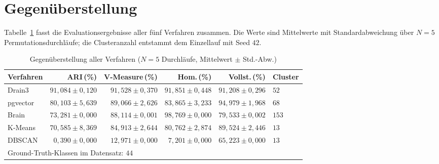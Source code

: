 \section{Gegenüberstellung}
\label{sec:eval:vergleich}

Tabelle~\ref{tab:eval:gesamt} fasst die Evaluationsergebnisse aller fünf Verfahren zusammen.
Die Werte sind Mittelwerte mit Standardabweichung über $N = 5$ Permutationsdurchläufe;
die Clusteranzahl entstammt dem Einzellauf mit Seed $42$.

\begin{table}[h]
    \centering
    \caption{Gegenüberstellung aller Verfahren ($N = 5$ Durchläufe, Mittelwert $\pm$ Std.-Abw.)}
    \label{tab:eval:gesamt}
    \begin{tabular}{lrrrrl}
        \toprule
        Verfahren
            & ARI\,(\%)
            & V-Measure\,(\%)
            & Hom.\,(\%)
            & Vollst.\,(\%)
            & Cluster \\
        \midrule
        Drain3
            & $91{,}084 \pm 0{,}120$
            & $91{,}528 \pm 0{,}370$
            & $91{,}851 \pm 0{,}448$
            & $91{,}208 \pm 0{,}296$
            & $52$ \\
        pgvector
            & $80{,}103 \pm 5{,}639$
            & $89{,}066 \pm 2{,}626$
            & $83{,}865 \pm 3{,}233$
            & $94{,}979 \pm 1{,}968$
            & $68$ \\
        Brain
            & $73{,}281 \pm 0{,}000$
            & $88{,}114 \pm 0{,}001$
            & $98{,}769 \pm 0{,}000$
            & $79{,}533 \pm 0{,}002$
            & $153$ \\
        K-Means
            & $70{,}585 \pm 8{,}369$
            & $84{,}913 \pm 2{,}644$
            & $80{,}762 \pm 2{,}874$
            & $89{,}524 \pm 2{,}446$
            & $13$ \\
        DBSCAN
            & $0{,}390 \pm 0{,}000$
            & $12{,}971 \pm 0{,}000$
            & $7{,}201 \pm 0{,}000$
            & $65{,}223 \pm 0{,}000$
            & $13$ \\
        \midrule
        \multicolumn{5}{l}{\footnotesize Ground-Truth-Klassen im Datensatz: $44$} \\
        \bottomrule
    \end{tabular}
\end{table}
